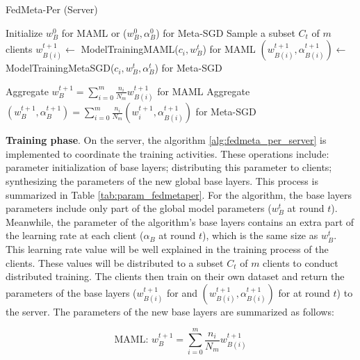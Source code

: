 \documentclass[runningheads]{llncs}
\begin{document}
\begin{algorithm}[h]
    \caption{FedMeta-Per (Server)} \label{alg:fedmeta_per_server}
    \begin{algorithmic}[1]
        \State Initialize $w_B^0$ for MAML or ($w_B^0, \alpha_B^0$) for Meta-SGD
            \State Sample a subset $C_t$ of $m$ clients
                \State $w_{B(i)}^{t+1} \gets$ ModelTrainingMAML($c_i, w_B^t$) for MAML
                \State $(w_{B(i)}^{t+1}, \alpha_{B(i)}^{t+1}) \gets$ ModelTrainingMetaSGD($c_i, w_B^t, \alpha_B^t$) for Meta-SGD
            \EndFor

            \State
            \State Aggregate $w_{B}^{t+1} = \sum_{i=0}^m \frac{n_i}{N_m} w_{B(i)}^{t+1}$ for MAML
            \State Aggregate $(w_B^{t+1}, \alpha_B^{t+1}) = \sum_{i=0}^m \frac{n_i}{N_m} (w_i^{t+1}, \alpha_{B(i)}^{t+1})$ for Meta-SGD
        \EndFor
    \end{algorithmic}
\end{algorithm}

\textbf{Training phase}. On the server, the algorithm \ref{alg:fedmeta_per_server} is implemented to coordinate the training activities. These operations include: parameter initialization of base layers; distributing this parameter to clients; synthesizing the parameters of the new global base layers. This process is summarized in Table \ref{tab:param_fedmetaper}. For the  algorithm, the base layers parameters include only part of the global model parameters ($w_B^t$ at round $t$). Meanwhile, the parameter of the  algorithm's base layers contains an extra part of the learning rate at each client ($\alpha_B$ at round $t$), which is the same size as $w_B^t$. This learning rate value will be well explained in the training process of the clients. These values will be distributed to a subset $C_t$ of $m$ clients to conduct distributed training. The clients then train on their own dataset and return the parameters of the base layers ($w_{B(i)}^{t+1}$ for  and $( w_{B(i)}^{t+1}, \alpha_{B(i)}^{t+1})$ for  at round $t$) to the server. The parameters of the new base layers are summarized as follows:

\begin{dmath}
    \text{MAML: } w_{B}^{t+1} = \sum_{i=0}^m \frac{n_i}{N_m} w_{B(i)}^{t+1}
\end{dmath}
\end{document}
